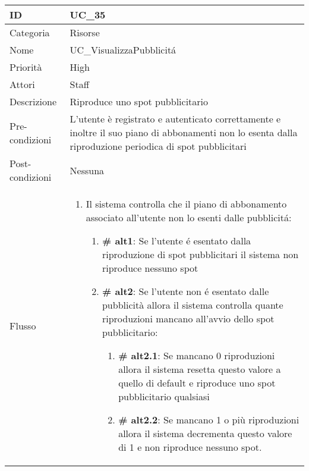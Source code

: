 \begin{center}
\begin{tabular}{ |p{2cm}|p{13cm}|  }
\hline
ID & UC\_35 \\\hline
Categoria & Risorse \\\hline
Nome & UC\_VisualizzaPubblicit\'a\\\hline
Priorità & High \\\hline
Attori &  Staff \\\hline
Descrizione & Riproduce uno spot pubblicitario\\\hline
Pre-condizioni & L'utente è registrato e autenticato correttamente e inoltre il suo piano di abbonamenti non lo esenta dalla riproduzione periodica di spot pubblicitari\\\hline
Post-condizioni & Nessuna\\\hline
Flusso &  	\begin{enumerate}
		\item Il sistema controlla che il piano di abbonamento associato all'utente non lo esenti dalle pubblicit\'a:
		 \begin{enumerate}[label*=\arabic*.]
			\item \textbf{\# alt1}: Se l'utente \'e esentato dalla riproduzione di spot pubblicitari il sistema non riproduce nessuno spot
			\item \textbf{\# alt2}: Se l'utente non \'e esentato dalle pubblicità allora il sistema controlla quante riproduzioni mancano all'avvio dello spot pubblicitario:
			 \begin{enumerate}[label*=\arabic*.]
				\item \textbf{\# alt2.1}: Se mancano 0 riproduzioni allora il sistema resetta questo valore a quello di default e riproduce uno spot pubblicitario qualsiasi
				\item \textbf{\# alt2.2}: Se mancano 1 o più riproduzioni allora il sistema decrementa questo valore di 1 e non riproduce nessuno spot.
			\end{enumerate}
		\end{enumerate}
		\end{enumerate}\\\hline
\end{tabular}
\label{table_use_case:35}\newline


\end{center}
